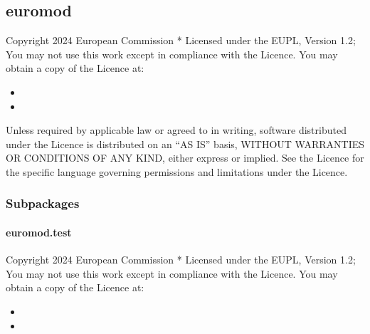 \documentclass[letterpaper,10pt,english]{sphinxmanual}
\begin{document}
\sphinxstepscope


\subsection{euromod}
\label{\detokenize{autoapi/euromod/index:module-euromod}}\label{\detokenize{autoapi/euromod/index:euromod}}\label{\detokenize{autoapi/euromod/index::doc}}
\sphinxAtStartPar
Copyright 2024 European Commission
*
Licensed under the EUPL, Version 1.2;
You may not use this work except in compliance with the Licence.
You may obtain a copy of the Licence at:
\begin{itemize}
\item {} 
\sphinxAtStartPar
{}

\item {} 
\end{itemize}

\sphinxAtStartPar
Unless required by applicable law or agreed to in writing, software distributed under the Licence is distributed on an “AS IS” basis,
WITHOUT WARRANTIES OR CONDITIONS OF ANY KIND, either express or implied.
See the Licence for the specific language governing permissions and limitations under the Licence.


\subsubsection{Subpackages}
\label{\detokenize{autoapi/euromod/index:subpackages}}
\sphinxstepscope


\paragraph{euromod.test}
\label{\detokenize{autoapi/euromod/test/index:module-euromod.test}}\label{\detokenize{autoapi/euromod/test/index:euromod-test}}\label{\detokenize{autoapi/euromod/test/index::doc}}
\sphinxAtStartPar
Copyright 2024 European Commission
*
Licensed under the EUPL, Version 1.2;
You may not use this work except in compliance with the Licence.
You may obtain a copy of the Licence at:
\begin{itemize}
\item {} 
\sphinxAtStartPar
{}

\item {} 
\end{itemize}
\end{document}
